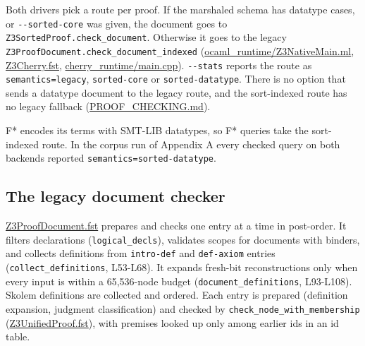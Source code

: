 \documentclass[10pt,a4paper]{article}
\begin{document}
Both drivers pick a route per proof. If the marshaled schema has datatype cases, or \texttt{-{}\allowbreak{}-{}\allowbreak{}sorted-{}\allowbreak{}core} was given, the document goes to \texttt{Z3SortedProof.\allowbreak{}check\_\allowbreak{}document}. Otherwise it goes to the legacy \texttt{Z3ProofDocument.\allowbreak{}check\_\allowbreak{}document\_\allowbreak{}indexed} (\href{https://github.com/Z3Prover/z3/blob/8fbb275aba0472e862e289c7af1331b3bd5d512c/fstar/ocaml_runtime/Z3NativeMain.ml\#L156-L178}{ocaml\_\allowbreak{}runtime/\allowbreak{}Z3Native\allowbreak{}Main.\allowbreak{}ml}, \href{https://github.com/Z3Prover/z3/blob/8fbb275aba0472e862e289c7af1331b3bd5d512c/fstar/Z3Cherry.fst\#L54-L65}{Z3Cherry.\allowbreak{}fst}, \href{https://github.com/Z3Prover/z3/blob/8fbb275aba0472e862e289c7af1331b3bd5d512c/fstar/cherry_runtime/main.cpp\#L300-L301}{cherry\_\allowbreak{}runtime/\allowbreak{}main.\allowbreak{}cpp}). \texttt{-{}\allowbreak{}-{}\allowbreak{}stats} reports the route as \texttt{semantics=\allowbreak{}legacy}, \texttt{sorted-{}\allowbreak{}core} or \texttt{sorted-{}\allowbreak{}datatype}. There is no option that sends a datatype document to the legacy route, and the sort-indexed route has no legacy fallback (\href{https://github.com/Z3Prover/z3/blob/8fbb275aba0472e862e289c7af1331b3bd5d512c/fstar/PROOF_CHECKING.md\#L144-L150}{PROOF\_\allowbreak{}CHECKING.\allowbreak{}md}).

F* encodes its terms with SMT-LIB datatypes, so F* queries take the sort-indexed route. In the corpus run of Appendix A every checked query on both backends reported \texttt{semantics=\allowbreak{}sorted-{}\allowbreak{}datatype}.

\subsection{The legacy document checker}\label{sec:34-the-legacy-document-checker}

\href{https://github.com/Z3Prover/z3/blob/8fbb275aba0472e862e289c7af1331b3bd5d512c/fstar/Z3ProofDocument.fst}{Z3Proof\allowbreak{}Document.\allowbreak{}fst} prepares and checks one entry at a time in post-order. It filters declarations (\texttt{logical\_\allowbreak{}decls}), validates scopes for documents with binders, and collects definitions from \texttt{intro-{}\allowbreak{}def} and \texttt{def-{}\allowbreak{}axiom} entries (\texttt{collect\_\allowbreak{}definitions}, L53-L68). It expands fresh-bit reconstructions only when every input is within a 65,536-node budget (\texttt{document\_\allowbreak{}definitions}, L93-L108). Skolem definitions are collected and ordered. Each entry is prepared (definition expansion, judgment classification) and checked by \texttt{check\_\allowbreak{}node\_\allowbreak{}with\_\allowbreak{}membership} (\href{https://github.com/Z3Prover/z3/blob/8fbb275aba0472e862e289c7af1331b3bd5d512c/fstar/Z3UnifiedProof.fst\#L1084-L1130}{Z3Unified\allowbreak{}Proof.\allowbreak{}fst}), with premises looked up only among earlier ids in an id table.
\end{document}
